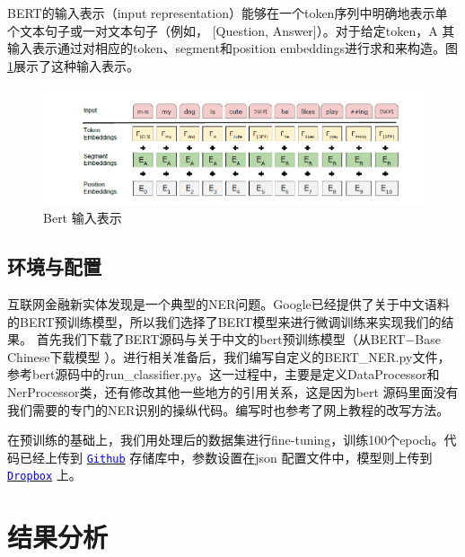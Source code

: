 \documentclass[11pt]{article}
\begin{document}
BERT的输入表示（input representation）能够在一个token序列中明确地表示单个文本句子或一对文本句子（例如， [Question, Answer]）。对于给定token，A%
其输入表示通过对相应的token、segment和position embeddings进行求和来构造。图\ref{embedding}展示了这种输入表示。

\begin{figure}[!ht]
    \centering
    \includegraphics[width=\linewidth]{pic/embedding.png}
    \caption{Bert 输入表示}
    \label{embedding}
\end{figure}

\subsection{环境与配置}
互联网金融新实体发现是一个典型的NER问题。Google已经提供了关于中文语料的BERT预训练模型，所以我们选择了BERT模型来进行微调训练来实现我们的结果。 %
首先我们下载了BERT源码与关于中文的bert预训练模型（从BERT$-$Base Chinese下载模型 ）。进行相关准备后，我们编写自定义的BERT\_NER.py文件，
参考bert源码中的run\_classifier.py。这一过程中，主要是定义DataProcessor和NerProcessor类，还有修改其他一些地方的引用关系，这是因为bert%
源码里面没有我们需要的专门的NER识别的操纵代码。编写时也参考了网上教程的改写方法。\par

在预训练的基础上，我们用处理后的数据集进行fine-tuning，训练100个epoch。代码已经上传到 \hyperref[code]{\texttt{\textcolor{blue}{Github}}} 存储库中，参数设置在json %
配置文件中，模型则上传到 \hyperref[code]{\texttt{\textcolor{blue}{Dropbox}}} 上。 

\section{结果分析}
\end{document}
